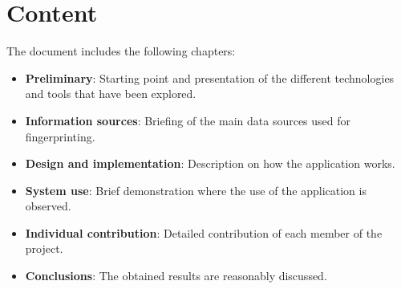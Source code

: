 \section{Content}
The document includes the following chapters:
\begin{itemize}
	\item \textbf{Preliminary}: Starting point and presentation of the different technologies and tools that have been explored.
	\item \textbf{Information sources}: Briefing of the main data sources used for fingerprinting.
	\item \textbf{Design and implementation}: Description on how the application works.
	\item \textbf{System use}: Brief demonstration where the use of the application is observed.
	\item \textbf{Individual contribution}: Detailed contribution of each member of the project.
	\item \textbf{Conclusions}: The obtained results are reasonably discussed.
\end{itemize}
